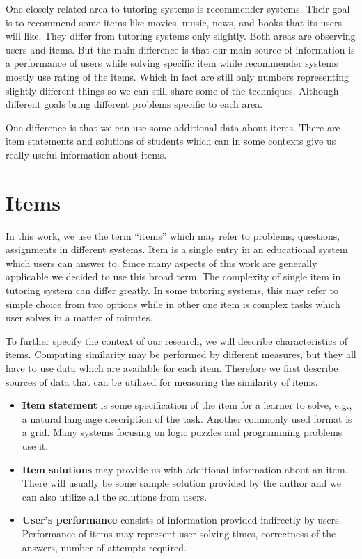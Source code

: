 \documentclass[
  digital, %
  table,   %
  nolof,     %
  nolot,     %
  nocover,
  color,
  final, %
]{fithesis3}
\begin{document}
One closely related area to tutoring systems is recommender systems. Their goal is to recommend some items like movies, music, news, and books that its users will like. They differ from tutoring systems only slightly. Both areas are observing users and items. But the main difference is that our main source of information is a performance of users while solving specific item while recommender systems mostly use rating of the items. Which in fact are still only numbers representing slightly different things so we can still share some of the techniques. Although different goals bring different problems specific to each area.


One difference is that we can use some additional data about items. There are item statements and solutions of students which can in some contexts give us really useful information about items.


\section{Items}\label{items}


In this work, we use the term ``items'' which may refer to problems, questions, assignments in different systems. Item is a single entry in an educational system which users can answer to. Since many aspects of this work are generally applicable we decided to use this broad term. The complexity of single item in tutoring system can differ greatly. In some tutoring systems, this may refer to simple choice from two options while in other one item is complex tasks which user solves in a matter of minutes.


To further specify the context of our research, we will describe characteristics of items. Computing similarity may be performed by different measures, but they all have to use data which are available for each item. Therefore we first describe sources of data that can be utilized for measuring the similarity of items.

\begin{itemize}
\item
  \textbf{Item statement} is some specification of the item for a learner to solve, e.g., a natural language description of the task. Another commonly used format is a grid. Many systems focusing on logic puzzles and programming problems use it.
\item
  \textbf{Item solutions} may provide us with additional information about an item. There will usually be some sample solution provided by the author and we can also utilize all the solutions from users.
\item
  \textbf{User's performance} consists of information provided indirectly by users. Performance of items may represent user solving times, correctness of the answers, number of attempts required.
\end{itemize}
\end{document}
